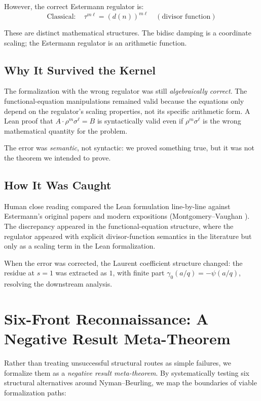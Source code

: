 \documentclass[11pt,a4paper]{article}
\theoremstyle{definition}
\theoremstyle{remark}
\begin{document}
However, the correct Estermann regulator is:
\[
\text{Classical}: \quad \tau^{m\ell} = (d(n))^{m\ell} \quad (\text{divisor function})
\]

These are distinct mathematical structures. The bidisc damping is a coordinate scaling; the Estermann regulator is an arithmetic function.

\subsection{Why It Survived the Kernel}

The formalization with the wrong regulator was still \emph{algebraically correct}. The functional-equation manipulations remained valid because the equations only depend on the regulator's scaling properties, not its specific arithmetic form. A Lean proof that $A \cdot \rho^m \sigma^\ell = B$ is syntactically valid even if $\rho^m \sigma^\ell$ is the wrong mathematical quantity for the problem.

The error was \emph{semantic}, not syntactic: we proved something true, but it was not the theorem we intended to prove.

\subsection{How It Was Caught}

Human close reading compared the Lean formulation line-by-line against Estermann's original papers \cite{Estermann1928} and modern expositions (Montgomery--Vaughan \cite{MontgomeryVaughan2007}). The discrepancy appeared in the functional-equation structure, where the regulator appeared with explicit divisor-function semantics in the literature but only as a scaling term in the Lean formalization.

When the error was corrected, the Laurent coefficient structure changed: the residue at $s=1$ was extracted as $1$, with finite part $\gamma_0(a/q) = -\psi(a/q)$, resolving the downstream analysis.

\section{Six-Front Reconnaissance: A Negative Result Meta-Theorem}
\label{sec:reconnaissance}

Rather than treating unsuccessful structural routes as simple failures, we formalize them as a \emph{negative result meta-theorem}. By systematically testing six structural alternatives around Nyman--Beurling, we map the boundaries of viable formalization paths:
\end{document}

